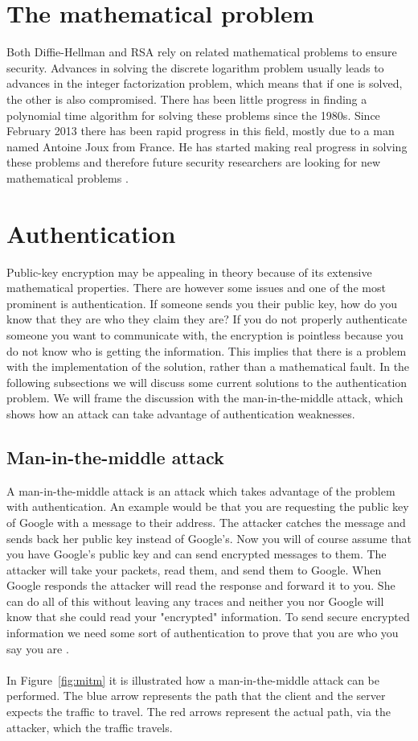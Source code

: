 \documentclass[frame, english]{idamasterthesis}
\begin{document}
\section{The mathematical problem}
Both Diffie-Hellman and RSA rely on related mathematical problems to ensure security. Advances in solving the discrete logarithm problem usually leads to advances in the integer factorization problem, which means that if one is solved, the other is also compromised. There has been little progress in finding a polynomial time algorithm for solving these problems since the 1980s. Since February 2013 there has been rapid progress in this field, mostly due to a man named Antoine Joux from France. He has started making real progress in solving these problems and therefore future security researchers are looking for new mathematical problems \cite{math}.

\section{Authentication}
Public-key encryption may be appealing in theory because of its extensive mathematical properties. There are however some issues and one of the most prominent is authentication. If someone sends you their public key, how do you know that they are who they claim they are? If you do not properly authenticate someone you want to communicate with, the encryption is pointless because you do not know who is getting the information. This implies that there is a problem with the implementation of the solution, rather than a mathematical fault. In the following subsections we will discuss some current solutions to the authentication problem. We will frame the discussion with the man-in-the-middle attack, which shows how an attack can take advantage of authentication weaknesses.

\subsection{Man-in-the-middle attack}
A man-in-the-middle attack is an attack which takes advantage of the problem with authentication.  An example would be that you are requesting the public key of Google with a message to their address. The attacker catches the message and sends back her public key instead of Google's. Now you will of course assume that you have Google's public key and can send encrypted messages to them. The attacker will take your packets, read them, and send them to Google. When Google responds the attacker will read the response and forward it to you. She can do all of this without leaving any traces and neither you nor Google will know that she could read your "encrypted" information. To send secure encrypted information we need some sort of authentication to prove that you are who you say you are \cite{maninthemiddle}. \\\\
In Figure~\ref{fig:mitm} it is illustrated how a man-in-the-middle attack can be performed. The blue arrow represents the path that the client and the server expects the traffic to travel. The red arrows represent the actual path, via the attacker, which the traffic travels. 
\end{document}
